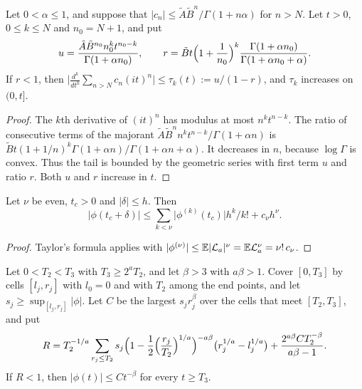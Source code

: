 \begin{lemma}[truncation]\label{lem:thr-trunc}
Let $0<\alpha\le1$, and suppose that
$\lvert c_n\rvert\le\tilde A\tilde B^n/\Gamma(1+n\alpha)$ for $n>N$. Let $t>0$,
$0\le k\le N$ and $n_0=N+1$, and put
\[
 u=\frac{\tilde A\tilde B^{n_0}n_0^kt^{n_0-k}}{\Gamma(1+\alpha n_0)},\qquad
 r=\tilde Bt\Bigl(1+\frac1{n_0}\Bigr)^k
 \frac{\Gamma(1+\alpha n_0)}{\Gamma(1+\alpha n_0+\alpha)} .
\]
If $r<1$, then
$\bigl\lvert\frac{d^k}{dt^k}\sum_{n>N}c_n(it)^n\bigr\rvert\le\tau_k(t):=u/(1-r)$,
and $\tau_k$ increases on $(0,t]$.
\end{lemma}

\begin{proof}
The $k$th derivative of $(it)^n$ has modulus at most $n^kt^{n-k}$. The ratio
of consecutive terms of the majorant
$\tilde A\tilde B^nn^kt^{n-k}/\Gamma(1+\alpha n)$ is
$\tilde Bt(1+1/n)^k\Gamma(1+\alpha n)/\Gamma(1+\alpha n+\alpha)$. It decreases
in $n$, because $\log\Gamma$ is convex. Thus the tail is bounded by the
geometric series with first term $u$ and ratio $r$. Both $u$ and $r$ increase
in $t$.
\end{proof}

\begin{lemma}\label{lem:thr-cells}
Let $\nu$ be even, $t_c>0$ and $\lvert\delta\rvert\le h$. Then
\[
 \lvert\phi(t_c+\delta)\rvert\le\sum_{k<\nu}\lvert\phi^{(k)}(t_c)\rvert
 h^k/k!+c_\nu h^\nu.
\]
\end{lemma}

\begin{proof}
Taylor's formula applies with
$\lvert\phi^{(\nu)}\rvert\le\mathbb{E}\lvert \mathcal L_a\rvert^\nu=\mathbb{E} \mathcal L_a^\nu=\nu!\,c_\nu$.
\end{proof}

\begin{lemma}\label{lem:thr-tail}
Let $0<T_2<T_3$ with $T_3\ge2^aT_2$, and let $\beta>3$ with $a\beta>1$.
Cover $[0,T_3]$ by cells $[l_j,r_j]$ with $l_0=0$ and with $T_2$ among the
end points, and let $s_j\ge\sup_{[l_j,r_j]}\lvert\phi\rvert$. Let $C$ be the
largest $s_jr_j^\beta$ over the cells that meet $[T_2,T_3]$, and put
\[
 R=T_2^{-1/a}\sum_{r_j\le T_2}s_j
 \Bigl(1-\frac12\Bigl(\frac{r_j}{T_2}\Bigr)^{1/a}\Bigr)^{-a\beta}
 \bigl(r_j^{1/a}-l_j^{1/a}\bigr)+\frac{2^{a\beta}CT_2^{-\beta}}{a\beta-1} .
\]
If $R<1$, then $\lvert\phi(t)\rvert\le Ct^{-\beta}$ for every $t\ge T_3$.
\end{lemma}

